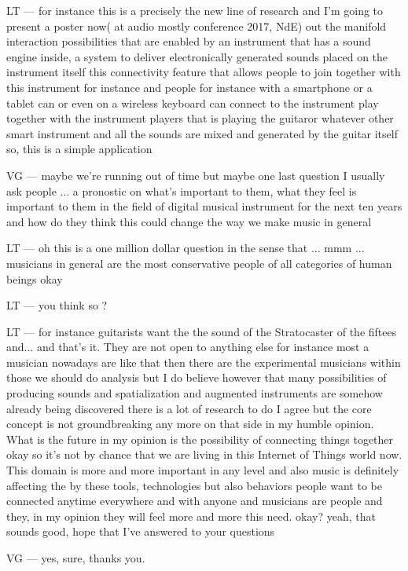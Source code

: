 LT — for instance this is a precisely the new line of research and I'm going to present a poster now( at audio mostly conference 2017, NdE) out the manifold interaction possibilities that are enabled by an instrument that has a sound engine inside, a system to deliver electronically generated sounds placed on the instrument itself this connectivity feature that allows people to join together with this instrument for instance and people for instance with a smartphone or a tablet can or even on a wireless keyboard can connect to the instrument play together with the instrument players that is playing the guitaror whatever other smart instrument and all the sounds are mixed and generated by the guitar itself so, this is a simple application

VG — maybe we're running out of time but maybe one last question I usually ask people ... a pronostic on what's important to them, what they feel is important to them in the field of digital musical instrument for the next ten years and how do they think this could change the way we make music in general

LT — oh this is a one million dollar question in the sense that ... mmm ... musicians in general are the most conservative people of all categories of human beings okay

LT — you think so ?

LT — for instance guitarists want the the sound of the Stratocaster of the fiftees and... and that's it. They are not open to anything else for instance most a musician nowadays are like that then there are the experimental musicians within those we should do analysis but I do believe however that many possibilities of producing sounds and spatialization and augmented instruments are somehow already being discovered there is a lot of research to do I agree but the core concept is not groundbreaking any more on that side in my humble opinion. What is the future in my opinion is the possibility of connecting things together okay so it's not by chance that we are living in this Internet of Things world now. This domain is more and more important in any level and also music is definitely affecting the by these tools, technologies but also behaviors people want to be connected anytime everywhere and with anyone and musicians are people and they, in my opinion they will feel more and more this need. okay? yeah, that sounds good, hope that I've answered to your questions

VG — yes, sure, thanks you.